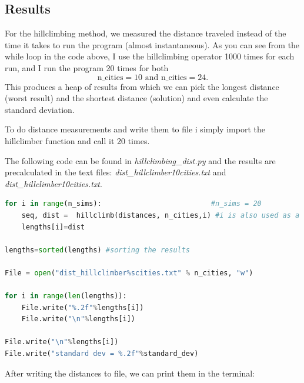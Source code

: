 \documentclass[10pt, a4paper]{article}
\begin{document}
\subsection{Results}
For the hillclimbing method, we measured the distance traveled instead of the time it takes to run the program (almost instantaneous).
As you can see from the while loop in the code above, I use the hillclimbing operator 1000 times for each run, and I run the program 20 times for both $$\text{n\_cities} = 10 \text{ and } \text{n\_cities} = 24.$$
This produces a heap of results from which we can pick the longest distance (worst result) and the shortest distance (solution) and even calculate the standard deviation.

To do distance measurements and write them to file i simply import the hillclimber function and call it 20 times.

The following code can be found in \emph{hillclimbing\_dist.py} and the results are precalculated
in the text files: \emph{dist\_hillclimber10cities.txt} and \emph{dist\_hillclimber10cities.txt}.
\begin{lstlisting}[language = Python]
 for i in range(n_sims):                          #n_sims = 20
    seq, dist =  hillclimb(distances, n_cities,i) #i is also used as a seed
    lengths[i]=dist

lengths=sorted(lengths) #sorting the results

File = open("dist_hillclimber%scities.txt" % n_cities, "w")   

for i in range(len(lengths)):
    File.write("%.2f"%lengths[i])
    File.write("\n"%lengths[i])

File.write("\n"%lengths[i])
File.write("standard dev = %.2f"%standard_dev)
\end{lstlisting}
After writing the distances to file, we can print them in the terminal:
\end{document}
